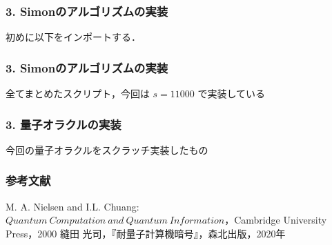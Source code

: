 \documentclass[dvipdfmx,12pt]{beamer}%
\begin{document}
\begin{frame}

\frametitle{3. Simonのアルゴリズムの実装}
              
初めに以下をインポートする．

\vspace{10pt}



                  
\end{frame}


\begin{frame}

\frametitle{3. Simonのアルゴリズムの実装}
              
全てまとめたスクリプト，今回は $ s = 11000 $ で実装している

\vspace{10pt}



                  
\end{frame}


\begin{frame}

\frametitle{3. 量子オラクルの実装}
              
今回の量子オラクルをスクラッチ実装したもの

\vspace{10pt}



                  
\end{frame}


\begin{frame}

\frametitle{参考文献}

\begin{thebibliography}{9}
  \beamertemplatetextbibitems
  M. A. Nielsen and I.L. Chuang: $Quantum \ Computation \ and \ Quantum \ Information$，Cambridge University Press，2000
  縫田 光司，『耐量子計算機暗号』，森北出版，2020年
\end{thebibliography}

\end{frame}
\end{document}

